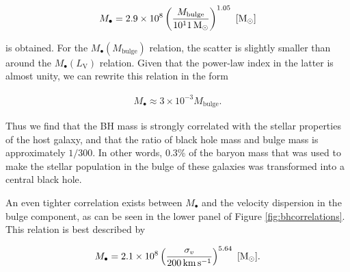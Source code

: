 \documentclass[a4paper,10pt]{article}
\begin{document}
\begin{align*}
    M_\bullet = 2.9\times10^8\left(\frac{M_\mathrm{bulge}}{10^11\,{\rm M_\odot}}\right)^{1.05} ~ [{\rm M_\odot}]
\end{align*}

{\noindent}is obtained. For the $M_\bullet(M_\mathrm{bulge})$ relation, the scatter is slightly smaller than around the $M_\bullet(L_\mathrm{V})$ relation. Given that the power-law index in the latter is almost unity, we can rewrite this relation in the form

\begin{align*}
    M_\bullet \approx 3\times10^{-3}M_\mathrm{bulge}.
\end{align*}

{\noindent}Thus we find that the BH mass is strongly correlated with the stellar properties of the host galaxy, and that the ratio of black hole mass and bulge mass is approximately $1/300$. In other words, 0.3\% of the baryon mass that was used to make the stellar population in the bulge of these galaxies was transformed into a central black hole.

{\noindent}An even tighter correlation exists between $M_\bullet$ and the velocity dispersion in the bulge component, as can be seen in the lower panel of Figure \ref{fig:bhcorrelations}. This relation is best described by

\begin{align*}
    M_\bullet = 2.1\times 10^8\left(\frac{\sigma_v}{200\,{\rm km\,s^{-1}}}\right)^{5.64} ~ [{\rm M_\odot}].
\end{align*}
\end{document}
